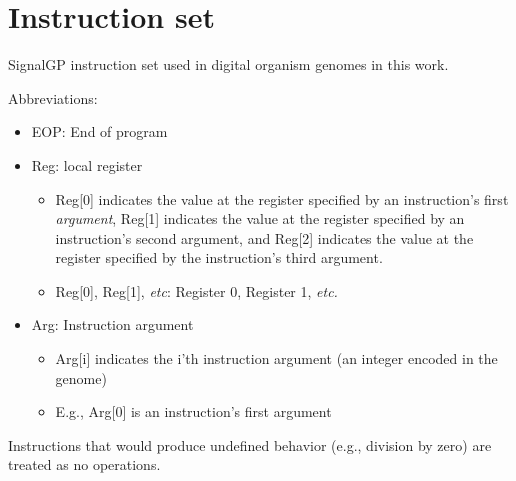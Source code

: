 \documentclass[
]{book}
\providecommand{\tightlist}{%
  \setlength{\itemsep}{0pt}\setlength{\parskip}{0pt}}
\begin{document}
\hypertarget{instruction-set}{%
\section{Instruction set}\label{instruction-set}}

SignalGP instruction set used in digital organism genomes in this work.

Abbreviations:

\begin{itemize}
\tightlist
\item
  EOP: End of program
\item
  Reg: local register

  \begin{itemize}
  \tightlist
  \item
    Reg{[}0{]} indicates the value at the register specified by an instruction's first \emph{argument}, Reg{[}1{]} indicates the value at the register specified by an instruction's second argument, and Reg{[}2{]} indicates the value at the register specified by the instruction's third argument.
  \item
    Reg{[}0{]}, Reg{[}1{]}, \emph{etc}: Register 0, Register 1, \emph{etc.}
  \end{itemize}
\item
  Arg: Instruction argument

  \begin{itemize}
  \tightlist
  \item
    Arg{[}i{]} indicates the i'th instruction argument (an integer encoded in the genome)
  \item
    E.g., Arg{[}0{]} is an instruction's first argument
  \end{itemize}
\end{itemize}

Instructions that would produce undefined behavior (e.g., division by zero) are treated as no operations.
\end{document}
